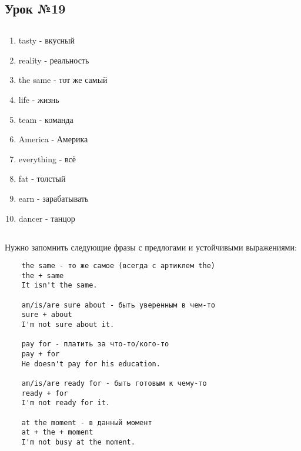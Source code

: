 \subsection{Урок №19}

\subsection*{}
\begin{multicols}{2}
    \begin{enumerate}\setlength{\itemsep}{0pt}
        \item tasty - вкусный
        \item reality - реальность
        \item the same - тот же самый
        \item life - жизнь
        \item team - команда
        \item America - Америка
        \item everything - всё
        \item fat - толстый
        \item earn - зарабатывать
        \item dancer - танцор
    \end{enumerate}
\end{multicols}

\subsection*{}
Нужно запомнить следующие фразы с предлогами и устойчивыми выражениями:
\begin{verbatim}
    the same - то же самое (всегда с артиклем the)
    the + same
    It isn't the same.

    am/is/are sure about - быть уверенным в чем-то
    sure + about
    I'm not sure about it.

    pay for - платить за что-то/кого-то
    pay + for
    He doesn't pay for his education.

    am/is/are ready for - быть готовым к чему-то
    ready + for
    I'm not ready for it.

    at the moment - в данный момент
    at + the + moment
    I'm not busy at the moment.
\end{verbatim}